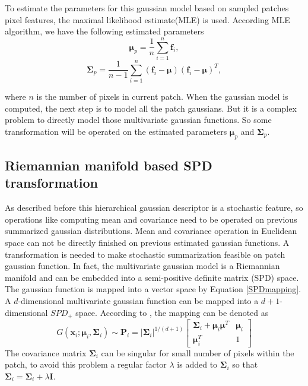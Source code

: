 To estimate the parameters for this gaussian model based on sampled patches pixel features, the maximal likelihood estimate(MLE) is used. According MLE algorithm, we have the following estimated parameters
\begin{equation}
\bm{\mu}_p = \frac{1}{n}\sum_{i = 1}^n \bm{f}_i,
\end{equation}
\begin{equation}
\bm{\Sigma}_p = \frac{1}{n-1} \sum_{i = 1}^n(\bm{f}_i-\bm{\mu})(\bm{f}_i-\bm{\mu})^T,
\end{equation}

where $n$ is the number of pixels in current patch. When the gaussian model is computed, the next step is to model all the patch gaussians. But it is a complex problem to directly model those multivariate gaussian functions. So some transformation will be operated on the estimated parameters $\bm{\mu}_p$ and $\bm{\Sigma}_p$.


\subsection{Riemannian manifold based SPD transformation}

As described before this hierarchical gaussian descriptor is a stochastic feature, so operations like computing mean and covariance need to be operated on previous summarized gaussian distributions. Mean and covariance operation in Euclidean space can not be directly finished on previous estimated gaussian functions. A transformation is needed to make stochastic summarization feasible on patch gaussian function.
In fact, the multivariate gaussian model is a Riemannian manifold and can be embedded into a semi-positive definite matrix (SPD) space. The gaussian function is mapped into a vector space by Equation \ref{SPDmapping}. A $d$-dimensional multivariate gaussian function can be mapped into a $d+1$-dimensional $SPD_+$ space. According to \cite{MultiVarGau}, the mapping can be denoted as 
\begin{equation}\label{SPDmapping}
G(\bm{x}_i;\bm{\mu}_i,\bm{\Sigma}_i) \sim \bm{P}_i  = |\bm{\Sigma}_i|^{1/(d+1)} \left[ \begin{matrix}
\bm{\Sigma}_i + \bm{\mu}_i\bm{\mu}^T & \bm{\mu}_i \\
\bm{\mu}_i^T & 1
\end{matrix}
\right]
\end{equation}
The covariance matrix $\bm{\Sigma}_i$ can be singular for small number of pixels within the patch, to avoid this problem a regular factor $\lambda$ is added to $\bm{\Sigma}_i$ so that $\bm{\Sigma}_i = \bm{\Sigma}_i + \lambda\bm{I}$. 

